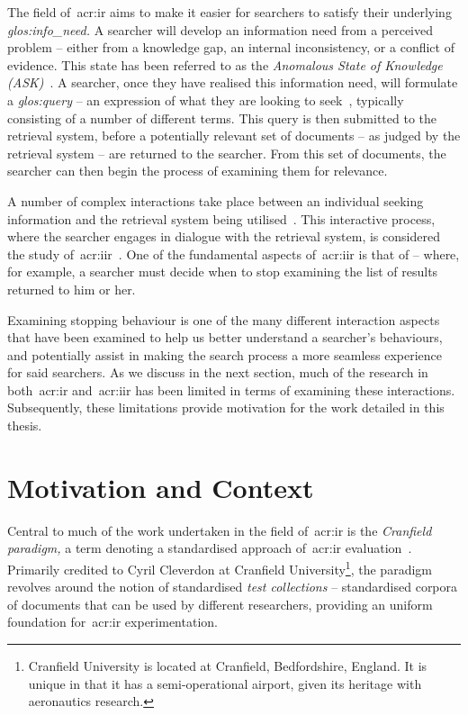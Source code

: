 The field of~\gls{acr:ir} aims to make it easier for searchers to satisfy their underlying \emph{\gls{glos:info_need}.} A searcher will develop an information need from a perceived problem -- either from a knowledge gap, an internal inconsistency, or a conflict of evidence. This state has been referred to as the \emph{Anomalous State of Knowledge (ASK)}~\citep{belkin1980ask}. A searcher, once they have realised this information need, will formulate a \emph{\gls{glos:query}} -- an expression of what they are looking to seek~\citep{borlund2003iir_model}, typically consisting of a number of different terms. This query is then submitted to the retrieval system, before a potentially relevant set of documents -- as judged by the retrieval system -- are returned to the searcher. From this set of documents, the searcher can then begin the process of examining them for relevance.

A number of complex interactions take place between an individual seeking information and the retrieval system being utilised~\citep{ingwersen2005theturn}. This interactive process, where the searcher engages in dialogue with the retrieval system, is considered the study of~\gls{acr:iir}~\citep{borlund2003iir_model}. One of the fundamental aspects of~\gls{acr:iir} is that of  -- where, for example, a searcher must decide when to stop examining the list of results returned to him or her.

Examining stopping behaviour is one of the many different interaction aspects that have been examined to help us better understand a searcher's behaviours, and potentially assist in making the search process a more seamless experience for said searchers. As we discuss in the next section, much of the research in both~\gls{acr:ir} and~\gls{acr:iir} has been limited in terms of examining these interactions. Subsequently, these limitations provide motivation for the work detailed in this thesis.

\section{Motivation and Context}
Central to much of the work undertaken in the field of~\gls{acr:ir} is the \emph{Cranfield paradigm,} a term denoting a standardised approach of~\gls{acr:ir} evaluation~\citep{aslib1966factors}. Primarily credited to Cyril Cleverdon at Cranfield University\footnote{Cranfield University is located at Cranfield, Bedfordshire, England. It is unique in that it has a semi-operational airport, given its heritage with aeronautics research.}, the paradigm revolves around the notion of standardised \emph{test collections} -- standardised corpora of documents that can be used by different researchers, providing an uniform foundation for~\gls{acr:ir} experimentation.

